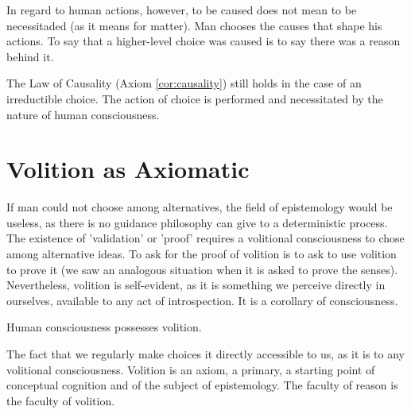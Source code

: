         In regard to human actions, however, to be caused does not mean to be necessitaded (as it means for matter). Man chooses the causes that shape his actions. To say that a higher-level choice was caused is to say there was a reason behind it.

        The Law of Causality (Axiom \ref{cor:causality}) still holds in the case of an irreductible choice. The action of choice is performed and necessitated by the nature of human consciousness.


    \section{Volition as Axiomatic}

        If man could not choose among alternatives, the field of epistemology would be useless, as there is no guidance philosophy can give to a deterministic process. The existence of 'validation' or 'proof' requires a volitional consciousness to chose among alternative ideas. To ask for the proof of volition is to ask to use volition to prove it (we saw an analogous situation when it is asked to prove the senses). Nevertheless, volition is self-evident, as it is something we perceive directly in ourselves, available to any act of introspection. It is a corollary of consciousness.

            \begin{corollary}[Volition]
                Human consciousness possesses volition.
            \end{corollary}

        The fact that we regularly make choices it directly accessible to us, as it is to any volitional consciousness. Volition is an axiom, a primary, a starting point of conceptual cognition and of the subject of epistemology. The faculty of reason is the faculty of volition.